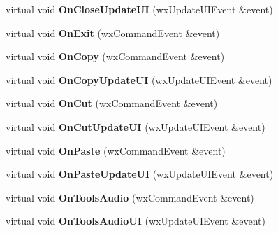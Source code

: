 \begin{DoxyCompactItemize}
\item 
\hypertarget{class_top_frame_a5fa1106de0693c88325cd4c64ecbd94c}{virtual void {\bfseries On\-Close\-Update\-U\-I} (wx\-Update\-U\-I\-Event \&event)}\label{class_top_frame_a5fa1106de0693c88325cd4c64ecbd94c}

\item 
\hypertarget{class_top_frame_aea48b19f458cbbc4c147440cfc690c46}{virtual void {\bfseries On\-Exit} (wx\-Command\-Event \&event)}\label{class_top_frame_aea48b19f458cbbc4c147440cfc690c46}

\item 
\hypertarget{class_top_frame_a9881e6bb8be2e113e7d9fc2a716e24e6}{virtual void {\bfseries On\-Copy} (wx\-Command\-Event \&event)}\label{class_top_frame_a9881e6bb8be2e113e7d9fc2a716e24e6}

\item 
\hypertarget{class_top_frame_a9d41733351b6db1434ec921cd7de8525}{virtual void {\bfseries On\-Copy\-Update\-U\-I} (wx\-Update\-U\-I\-Event \&event)}\label{class_top_frame_a9d41733351b6db1434ec921cd7de8525}

\item 
\hypertarget{class_top_frame_a0af1a4ab11be1ddd910029789b3dea3b}{virtual void {\bfseries On\-Cut} (wx\-Command\-Event \&event)}\label{class_top_frame_a0af1a4ab11be1ddd910029789b3dea3b}

\item 
\hypertarget{class_top_frame_a53e123763a3b9ec0ec5c58017f70b48e}{virtual void {\bfseries On\-Cut\-Update\-U\-I} (wx\-Update\-U\-I\-Event \&event)}\label{class_top_frame_a53e123763a3b9ec0ec5c58017f70b48e}

\item 
\hypertarget{class_top_frame_ac76966928c8491bb5adbd1acc8678fd5}{virtual void {\bfseries On\-Paste} (wx\-Command\-Event \&event)}\label{class_top_frame_ac76966928c8491bb5adbd1acc8678fd5}

\item 
\hypertarget{class_top_frame_a384a65f40c483dcbd2cc1151bd71bfbb}{virtual void {\bfseries On\-Paste\-Update\-U\-I} (wx\-Update\-U\-I\-Event \&event)}\label{class_top_frame_a384a65f40c483dcbd2cc1151bd71bfbb}

\item 
\hypertarget{class_top_frame_aed15be3f44741ca04b3681ec625a326b}{virtual void {\bfseries On\-Tools\-Audio} (wx\-Command\-Event \&event)}\label{class_top_frame_aed15be3f44741ca04b3681ec625a326b}

\item 
\hypertarget{class_top_frame_ad8454329da0c84b5097524c4b11702ef}{virtual void {\bfseries On\-Tools\-Audio\-U\-I} (wx\-Update\-U\-I\-Event \&event)}\label{class_top_frame_ad8454329da0c84b5097524c4b11702ef}


\end{DoxyCompactItemize}
